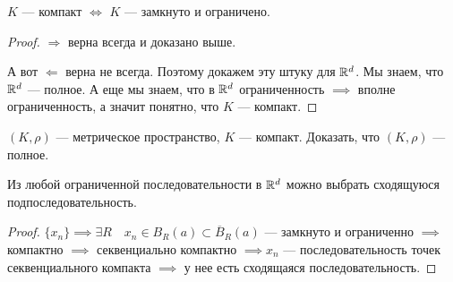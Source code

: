 \begin{consequence}
    $K$ --- компакт  $\iff$  $K$ --- замкнуто и ограничено. 
\end{consequence}
\begin{proof}
    $\Rightarrow$ верна всегда и доказано выше.

    А вот  $\Leftarrow$ верна не всегда. Поэтому докажем эту штуку для  $\mathbb{R}^d$. Мы знаем, что  $\mathbb{R}^d$ --- полное. А еще мы знаем, что в  $\mathbb{R}^d$ ограниченность  $\implies$ вполне ограниченность, а значит понятно, что  $K$ --- компакт.
\end{proof}
\begin{exerc}
    $(K, \rho)$ --- метрическое пространство,  $K$ --- компакт. Доказать, что  $(K, \rho)$ --- полное.
\end{exerc}

\begin{consequence}
    Из любой ограниченной последовательности в $\mathbb{R}^d$ можно выбрать сходящуюся подпоследовательность.
\end{consequence}
\begin{proof}
    $\{x_n\} \implies \exists R\quad x_n \in B_R(a) \subset \overline{B}_R(a)$ --- замкнуто и ограниченно $\implies$ компактно  $\implies$ секвенциально компактно $\implies x_n$ --- последовательность точек секвенциального компакта  $\implies$ у нее есть сходящаяся последовательность.
\end{proof}

